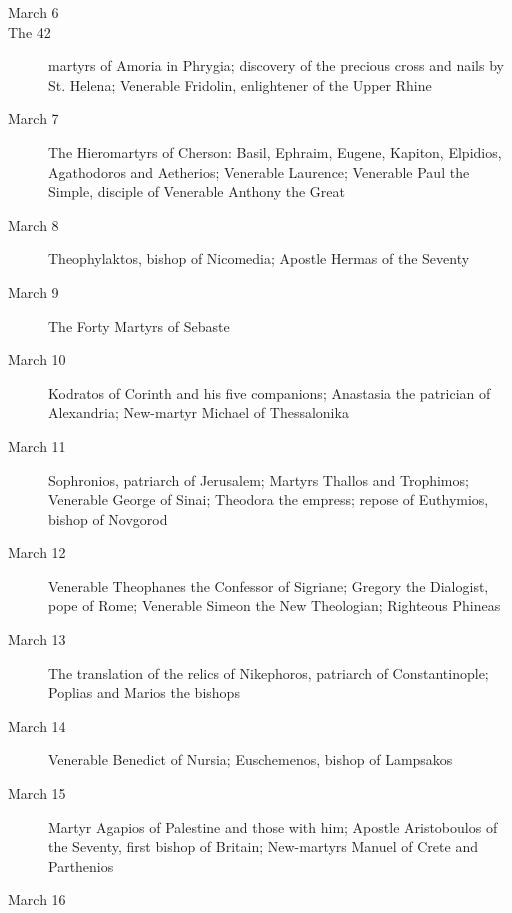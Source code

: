 \begin{description}
\item[March 6]

\item[The 42] martyrs of Amoria in Phrygia; discovery of the precious cross and nails by St. Helena; Venerable Fridolin, enlightener of the Upper Rhine

\item[March 7]

The Hieromartyrs of Cherson: Basil, Ephraim, Eugene, Kapiton, Elpidios, Agathodoros and Aetherios; Venerable Laurence; Venerable Paul the Simple, disciple of Venerable Anthony the Great

\item[March 8]

Theophylaktos, bishop of Nicomedia; Apostle Hermas of the Seventy

\item[March 9]

The Forty Martyrs of Sebaste

\item[March 10]

Kodratos of Corinth and his five companions; Anastasia the patrician of Alexandria; New-martyr Michael of Thessalonika

\item[March 11]

Sophronios, patriarch of Jerusalem; Martyrs Thallos and Trophimos; Venerable George of Sinai; Theodora the empress; repose of Euthymios, bishop of Novgorod

\item[March 12]

Venerable Theophanes the Confessor of Sigriane; Gregory the Dialogist, pope of Rome; Venerable Simeon the New Theologian; Righteous Phineas

\item[March 13]

The translation of the relics of Nikephoros, patriarch of Constantinople; Poplias and Marios the bishops

\item[March 14]

Venerable Benedict of Nursia; Euschemenos, bishop of Lampsakos

\item[March 15]

Martyr Agapios of Palestine and those with him; Apostle Aristoboulos of the Seventy, first bishop of Britain; New-martyrs Manuel of Crete and Parthenios

\item[March 16]


\end{description}

